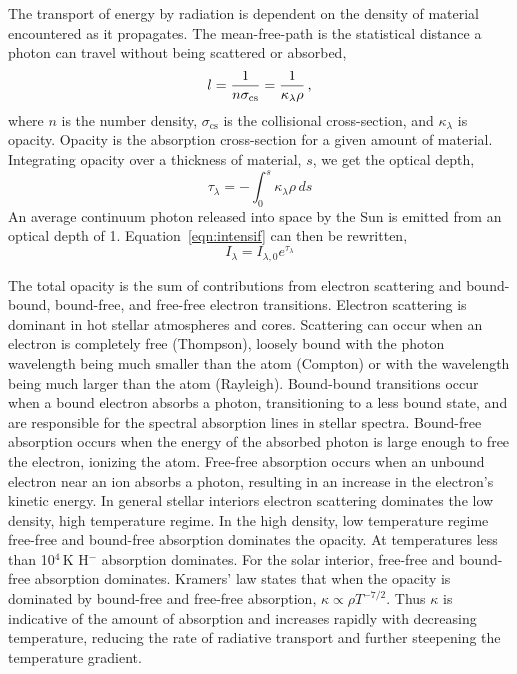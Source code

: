 The transport of energy by radiation is dependent on the density of material encountered as it propagates.
The mean-free-path is the statistical distance a photon can travel without being scattered or absorbed,
\begin{equation}
l = \frac{1}{n \sigma_\mathrm{cs}} = \frac{1}{\kappa_{\lambda} \rho} \mbox{\,,}
\end{equation}
where $n$ is the number density, $\sigma_\mathrm{cs}$ is the collisional cross-section, and $\kappa_{\lambda}$ is opacity.
Opacity is the absorption cross-section for a given amount of material. Integrating opacity over a thickness of material, $s$, we get the optical depth,
\begin{equation}
\tau_{\lambda} = -\int_0^s \kappa_\lambda \rho\,ds %
\end{equation}
An average continuum photon released into space by the Sun is emitted from an optical depth of 1.
Equation~\ref{eqn:intensif} can then be rewritten,
\begin{equation}
I_\lambda = I_{\lambda,0} e^{\tau_{\lambda}} %
\end{equation}

The total opacity is the sum of contributions from electron scattering and bound-bound, bound-free, and free-free electron transitions. Electron scattering is dominant in hot stellar atmospheres and cores. Scattering can occur when an electron is completely free (Thompson), loosely bound with the photon wavelength being much smaller than the atom (Compton) or with the wavelength being much larger than the atom (Rayleigh). Bound-bound transitions occur when a bound electron absorbs a photon, transitioning to a less bound state, and are responsible for the spectral absorption lines in stellar spectra. Bound-free absorption occurs when the energy of the absorbed photon is large enough to free the electron, ionizing the atom. Free-free absorption occurs when an unbound electron near an ion absorbs a photon, resulting in an increase in the electron's kinetic energy. %
In general stellar interiors electron scattering dominates the low density, high temperature regime. In the high density, low temperature regime free-free and bound-free absorption dominates the opacity. At temperatures less than 10$^4$\,K H$^-$ absorption dominates. For the solar interior, free-free and bound-free absorption dominates.
Kramers' law states that when the opacity is dominated by bound-free and free-free absorption, $\kappa \propto \rho T^{-7/2}$. Thus $\kappa$ is indicative of the amount of absorption and increases rapidly with decreasing temperature, reducing the rate of radiative transport and further steepening the temperature gradient.

